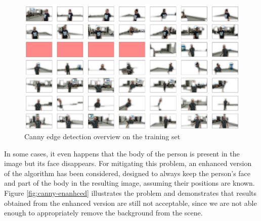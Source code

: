 \begin{figure}[!htb]
	\centering
	\includegraphics[width=1\textwidth]{"contents/images/04-1canny-overview"}
	\caption[Canny edge detection overview on the training set]{Canny edge detection overview on the training set}
	\label{fig:canny-overview}
\end{figure}

\medskip

In some cases, it even happens that the body of the person is present in the image but its face disappears. For mitigating this problem, an enhanced version of the algorithm has been considered, designed to always keep the person's face and part of the body in the resulting image, assuming their positions are known. Figure \ref{fig:canny-enanhced} illustrates the problem and demonstrates that results obtained from the enhanced version are still not acceptable, since we are not able enough to appropriately remove the background from the scene.

